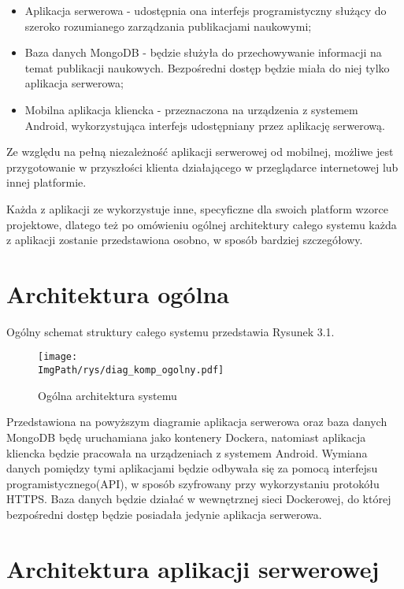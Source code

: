\documentclass[a4paper,12pt,twoside,openany]{report}
\newcommand{\ImgPath}{.}
\begin{document}
\begin{itemize}
	\item Aplikacja serwerowa - udostępnia ona interfejs programistyczny służący do szeroko rozumianego zarządzania publikacjami naukowymi; 
	\item Baza danych MongoDB - będzie służyła do przechowywanie informacji na temat publikacji naukowych. Bezpośredni dostęp będzie miała do niej tylko aplikacja serwerowa;
	\item Mobilna aplikacja kliencka - przeznaczona na urządzenia z systemem Android, wykorzystująca interfejs udostępniany przez aplikację serwerową.
\end{itemize}

Ze względu na pełną niezależność aplikacji serwerowej od mobilnej, możliwe jest przygotowanie w przyszłości klienta działającego w przeglądarce internetowej lub innej platformie. 

Każda z aplikacji ze wykorzystuje inne, specyficzne dla swoich platform wzorce projektowe, dlatego też po omówieniu ogólnej architektury całego systemu  każda z aplikacji zostanie przedstawiona osobno, w sposób bardziej szczegółowy. 

\newpage
\section{Architektura ogólna}
Ogólny schemat struktury całego systemu przedstawia Rysunek 3.1.

 \begin{figure}[!htbp]
 	\begin{center}
 		\centering
 		\texttt{[image: \\ImgPath/rys/diag\_komp\_ogolny.pdf]}
 	\end{center}
 	\caption{Ogólna architektura systemu}
 	\label{ogolnaArchitektura}
 \end{figure}
 Przedstawiona na powyższym diagramie aplikacja serwerowa oraz baza danych MongoDB będę uruchamiana jako kontenery Dockera, natomiast aplikacja kliencka będzie pracowała na urządzeniach z systemem Android. Wymiana danych pomiędzy tymi aplikacjami będzie odbywała się za pomocą interfejsu programistycznego(API), w sposób szyfrowany przy wykorzystaniu protokółu HTTPS.
 Baza danych będzie działać w wewnętrznej sieci Dockerowej, do której bezpośredni dostęp będzie posiadała jedynie aplikacja serwerowa. 

\section{Architektura aplikacji serwerowej}
\end{document}

